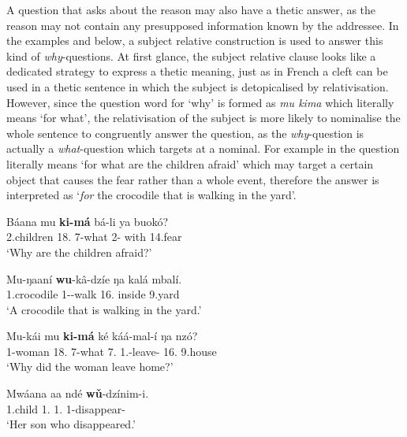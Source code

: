 \documentclass[output=paper,colorlinks,citecolor=brown,
]{langscibook}
\begin{document}
A question that asks about the reason may also have a thetic answer, as the reason may not contain any presupposed information known by the addressee. In the examples  and  below, a subject relative construction is used to answer this kind of \textit{why}-questions. At first glance, the subject relative clause looks like a dedicated strategy to express a thetic meaning, just as in French a cleft can be used in a thetic sentence in which the subject is detopicalised by relativisation. However, since the question word for `why' is formed as \textit{mu kima} which literally means `for what', the relativisation of the subject is more likely to nominalise the whole sentence to congruently answer the question, as the \textit{why}-question is actually a \textit{what}-question which targets at a nominal. For example in  the question literally means `for what are the children afraid' which may target a certain object that causes the fear rather than a whole event, therefore the answer is interpreted as `\textit{for} the crocodile that is walking in the yard'. 
\begin{exe}
    \ex \label{16}
    \begin{xlist}
\ex
\label{16a}
\gll
Báana mu \textbf{ki-má} bá-li ya buokó?\\
2.children 18.\Loc{} 7-what 2\Sm{}-\Cop{} with 14.fear\\
\trans ‘Why are the children afraid?’

\ex
\label{16b}
\gll
Mu-ŋaaní \textbf{wu}-k\^{a}-dzíe ŋa kalá mbalí.\\
1.crocodile 1\Rel{}-\Prs{}-walk 16.\Loc{} inside 9.yard\\
\trans ‘A crocodile that is walking in the yard.’

    \end{xlist}
\end{exe}
\begin{exe} 
    \ex \label{17}
    \begin{xlist}
\ex
\label{17a}
\gll
Mu-kái mu \textbf{ki-má} ké káá-mal-í ŋa nzó?\\
1-woman 18.\Loc{} 7-what 7.\Pro{} 1\Sm{}.\Pst{}-leave-\Pst{} 16.\Loc{} 9.house\\
\trans ‘Why did the woman leave home?’

\ex
\label{17b}
\gll
Mwáana aa ndé \textbf{wǔ}-dzínim-i.\\
1.child 1.\Conn{} 1.\Pro{} 1\Rel{}-disappear-\Pst{}\\
\trans ‘Her son who disappeared.’

    \end{xlist}
\end{exe}
\end{document}
